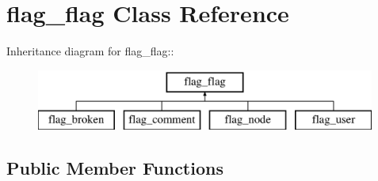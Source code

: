 \hypertarget{classflag__flag}{
\section{flag\_\-flag Class Reference}
\label{classflag__flag}
}
Inheritance diagram for flag\_\-flag::\begin{figure}[H]
\begin{center}
\leavevmode
\includegraphics[height=2cm]{classflag__flag}
\end{center}
\end{figure}
\subsection*{Public Member Functions}
